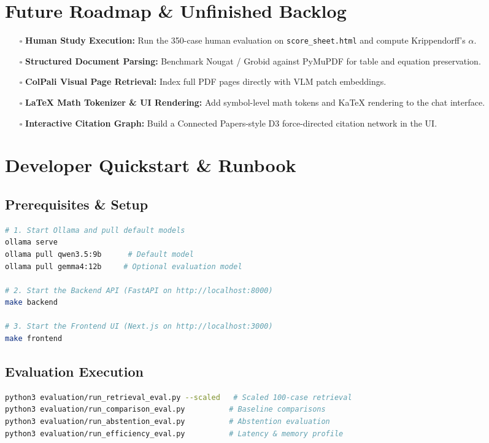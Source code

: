\documentclass[10pt,a4paper]{article}
\begin{document}
\section{Future Roadmap \& Unfinished Backlog}

\begin{itemize}[leftmargin=1.5em, itemsep=2pt]
    \item[$\square$] \textbf{Human Study Execution:} Run the 350-case human evaluation on \texttt{score\_sheet.html} and compute Krippendorff's $\alpha$.
    \item[$\square$] \textbf{Structured Document Parsing:} Benchmark Nougat / Grobid against PyMuPDF for table and equation preservation.
    \item[$\square$] \textbf{ColPali Visual Page Retrieval:} Index full PDF pages directly with VLM patch embeddings.
    \item[$\square$] \textbf{LaTeX Math Tokenizer \& UI Rendering:} Add symbol-level math tokens and KaTeX rendering to the chat interface.
    \item[$\square$] \textbf{Interactive Citation Graph:} Build a Connected Papers-style D3 force-directed citation network in the UI.
\end{itemize}

\section{Developer Quickstart \& Runbook}

\subsection{Prerequisites \& Setup}
\begin{lstlisting}[language=bash]
# 1. Start Ollama and pull default models
ollama serve
ollama pull qwen3.5:9b      # Default model
ollama pull gemma4:12b     # Optional evaluation model

# 2. Start the Backend API (FastAPI on http://localhost:8000)
make backend

# 3. Start the Frontend UI (Next.js on http://localhost:3000)
make frontend
\end{lstlisting}

\subsection{Evaluation Execution}
\begin{lstlisting}[language=bash]
python3 evaluation/run_retrieval_eval.py --scaled   # Scaled 100-case retrieval
python3 evaluation/run_comparison_eval.py          # Baseline comparisons
python3 evaluation/run_abstention_eval.py          # Abstention evaluation
python3 evaluation/run_efficiency_eval.py          # Latency & memory profile
\end{lstlisting}
\end{document}
